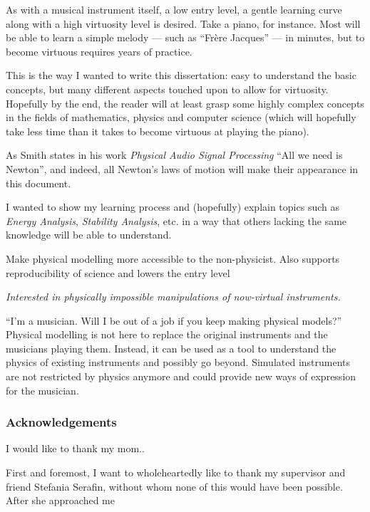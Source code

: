 As with a musical instrument itself, a low entry level, a gentle learning curve along with a high virtuosity level is desired. Take a piano, for instance. Most will be able to learn a simple melody — such as “Fr\`ere Jacques” — in minutes, but to become virtuous requires years of practice.

This is the way I wanted to write this dissertation: easy to understand the basic concepts, but many different aspects touched upon to allow for virtuosity. Hopefully by the end, the reader will at least grasp some highly complex concepts in the fields of mathematics, physics and computer science (which will hopefully take less time than it takes to become virtuous at playing the piano). 

As Smith states in his work \textit{Physical Audio Signal Processing} \cite{Smith2010b} ``All we need is Newton'', and indeed, all Newton's laws of motion will make their appearance in this document.


I wanted to show my learning process and (hopefully) explain topics such as \textit{Energy Analysis}, \textit{Stability Analysis}, etc. in a way that others lacking the same knowledge %
will be able to understand.

Make physical modelling more accessible to the non-physicist. Also supports reproducibility of science and lowers the entry level   


\textit{Interested in physically impossible manipulations of now-virtual instruments.}


 ``I'm a musician. Will I be out of a job if you keep making physical models?'' Physical modelling is not here to replace the original instruments and the musicians playing them. Instead, it can be used as a tool to understand the physics of existing instruments and possibly go beyond. Simulated instruments are not restricted by physics anymore and could provide new ways of expression for the musician.

\subsubsection{Acknowledgements}

I would like to thank my mom..

First and foremost, I want to wholeheartedly like to thank my supervisor and friend Stefania Serafin, without whom none of this would have been possible. After she approached me 

